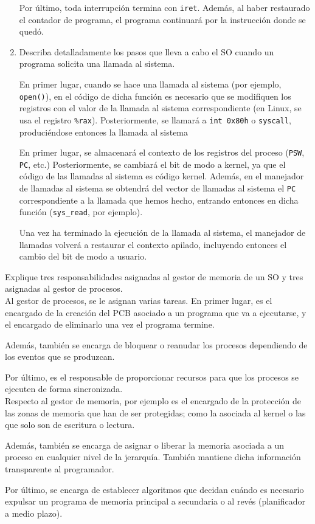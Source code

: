 \begin{ejercicio}
\begin{enumerate}
        Por último, toda interrupción termina con \verb|iret|. Además, al haber restaurado el contador de programa, el programa continuará por la instrucción donde se quedó.
        
        \item Describa detalladamente los pasos que lleva a cabo el SO cuando un programa solicita una llamada al sistema.

        En primer lugar, cuando se hace una llamada al sistema (por ejemplo, \verb|open()|), en el código de dicha función es necesario que se modifiquen los registros con el valor de la llamada al sistema correspondiente (en Linux, se usa el registro \verb|%rax|). Posteriormente, se llamará a \verb|int 0x80h| o \verb|syscall|, produciéndose entonces la llamada al sistema
        
        En primer lugar, se almacenará el contexto de los registros del proceso (\verb|PSW|, \verb|PC|, etc.) Posteriormente, se cambiará el bit de modo a kernel, ya que el código de las llamadas al sistema es código kernel. Además, en el manejador de llamadas al sistema se obtendrá del vector de llamadas al sistema el \verb|PC| correspondiente a la llamada que hemos hecho, entrando entonces en dicha función (\verb|sys_read|, por ejemplo).

        Una vez ha terminado la ejecución de la llamada al sistema, el manejador de llamadas volverá a restaurar el contexto apilado, incluyendo entonces el cambio del bit de modo a usuario.
    \end{enumerate}
\end{ejercicio}

\begin{ejercicio}
    Explique tres responsabilidades asignadas al gestor de memoria de un SO y tres asignadas al gestor de procesos.\\

    Al gestor de procesos, se le asignan varias tareas. En primer lugar, es el encargado de la creación del PCB asociado a un programa que va a ejecutarse, y el encargado de eliminarlo una vez el programa termine.

    Además, también se encarga de bloquear o reanudar los procesos dependiendo de los eventos que se produzcan.

    Por último, es el responsable de proporcionar recursos para que los procesos se ejecuten de forma sincronizada.\\

    Respecto al gestor de memoria, por ejemplo es el encargado de la protección de las zonas de memoria que han de ser protegidas; como la asociada al kernel o las que solo son de escritura o lectura.

    Además, también se encarga de asignar o liberar la memoria asociada a un proceso en cualquier nivel de la jerarquía. También mantiene dicha información transparente al programador.

    Por último, se encarga de establecer algoritmos que decidan cuándo es necesario expulsar un programa de memoria principal a secundaria o al revés (planificador a medio plazo).
\end{ejercicio}

